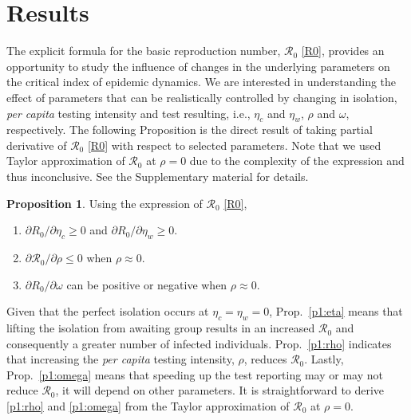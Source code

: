 \documentclass[12pt]{article}
\newcommand{\percap}{\emph{per capita}\xspace}
\newcommand{\Rnum}{\mathcal{R}_0}
\theoremstyle{definition} %
\newtheorem{proposition}{Proposition}
\begin{document}
\section{Results}

The explicit formula for the basic reproduction number, $\Rnum$ \eqref{R0}, provides an opportunity to study the influence of changes in the underlying parameters on the critical index of epidemic dynamics. We are interested in understanding the effect of parameters that can be realistically controlled by changing in isolation, \percap testing intensity and test resulting, i.e., $\eta_c$ and $\eta_w$, $\rho$ and $\omega$, respectively. The following Proposition is the direct result of taking partial derivative of $\Rnum$ \eqref{R0} with respect to selected parameters. Note that we used Taylor approximation of $\Rnum$ at $\rho=0$ due to the complexity of the expression and thus inconclusive. See the Supplementary material for details.

\begin{proposition}
\label{prop1}
Using the expression of $\Rnum$ \eqref{R0},
\begin{enumerate}
\item \label{p1:eta}
$\partial{R_0}/\partial{\eta_c} \geq 0$ and $\partial{R_0}/\partial{\eta_w} \geq 0$. 
\item \label{p1:rho}
$\partial{\Rnum}/\partial{\rho} \leq 0$ when $\rho \approx 0$.
\item \label{p1:omega}
$\partial{R_0}/\partial{\omega}$ can be positive or negative when $\rho \approx 0$.
\end{enumerate}
\end{proposition}

 Given that the perfect isolation occurs at $\eta_c=\eta_w = 0$, Prop.~\ref{p1:eta} means that lifting the isolation from awaiting group results in an increased $\Rnum$ and consequently a greater number of infected individuals. Prop.~\ref{p1:rho} indicates that increasing the \percap testing intensity, $\rho$, reduces $\Rnum$. Lastly, Prop.~\ref{p1:omega} means that speeding up the test reporting may or may not reduce $\Rnum$, it will depend on other parameters. It is straightforward to derive \ref{p1:rho} and \ref{p1:omega} from the Taylor approximation of $\Rnum$ at $\rho=0$. 
 
\end{document}
